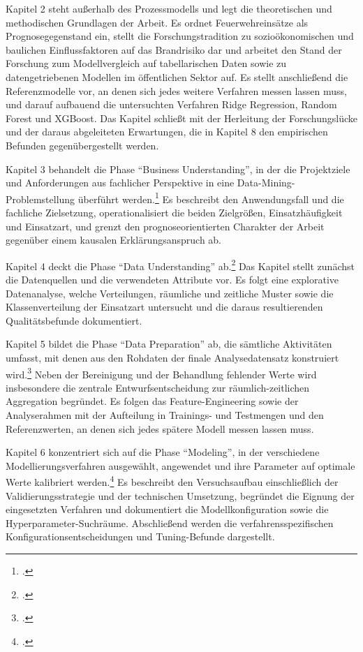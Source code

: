 \documentclass[12pt,a4paper]{article}
\begin{document}
Kapitel 2 steht außerhalb des Prozessmodells und legt die theoretischen und methodischen
Grundlagen der Arbeit. Es ordnet Feuerwehreinsätze als Prognosegegenstand ein, stellt die
Forschungstradition zu sozioökonomischen und baulichen Einflussfaktoren auf das Brandrisiko dar
und arbeitet den Stand der Forschung zum Modellvergleich auf tabellarischen Daten sowie zu
datengetriebenen Modellen im öffentlichen Sektor auf. Es stellt anschließend die
Referenzmodelle vor, an denen sich jedes weitere Verfahren messen lassen muss, und
darauf aufbauend die untersuchten Verfahren Ridge Regression, Random Forest und XGBoost.
Das Kapitel schließt mit der
Herleitung der Forschungslücke und der daraus abgeleiteten Erwartungen, die in Kapitel 8 den
empirischen Befunden gegenübergestellt werden.

Kapitel 3 behandelt die Phase \enquote{Business Understanding}, in der die Projektziele und
Anforderungen aus fachlicher Perspektive in eine Data-Mining-Problemstellung überführt
werden.\footcite[??]{Wirth2000} Es beschreibt den Anwendungsfall und die fachliche Zielsetzung,
operationalisiert die beiden Zielgrößen, Einsatzhäufigkeit und Einsatzart, und grenzt den
prognoseorientierten Charakter der Arbeit gegenüber einem kausalen Erklärungsanspruch ab.

Kapitel 4 deckt die Phase \enquote{Data Understanding} ab.\footcite[??]{Wirth2000} Das Kapitel
stellt zunächst die Datenquellen und die verwendeten Attribute vor. Es folgt eine explorative
Datenanalyse, welche Verteilungen, räumliche und zeitliche Muster sowie die Klassenverteilung der
Einsatzart untersucht und die daraus resultierenden Qualitätsbefunde dokumentiert.

Kapitel 5 bildet die Phase \enquote{Data Preparation} ab, die sämtliche Aktivitäten umfasst, mit
denen aus den Rohdaten der finale Analysedatensatz konstruiert wird.\footcite[??]{Wirth2000} Neben
der Bereinigung und der Behandlung fehlender Werte wird insbesondere die zentrale
Entwurfsentscheidung zur räumlich-zeitlichen Aggregation begründet. Es folgen das
Feature-Engineering sowie der Analyserahmen mit der Aufteilung in Trainings- und Testmengen und
den Referenzwerten, an denen sich jedes spätere Modell messen lassen muss.

Kapitel 6 konzentriert sich auf die Phase \enquote{Modeling}, in der verschiedene
Modellierungsverfahren ausgewählt, angewendet und ihre Parameter auf optimale Werte kalibriert
werden.\footcite[??]{Wirth2000} Es beschreibt den Versuchsaufbau einschließlich der
Validierungsstrategie und der technischen Umsetzung, begründet die Eignung der eingesetzten
Verfahren und dokumentiert die Modellkonfiguration sowie die Hyperparameter-Suchräume.
Abschließend werden die verfahrensspezifischen Konfigurationsentscheidungen und Tuning-Befunde
dargestellt.
\end{document}
